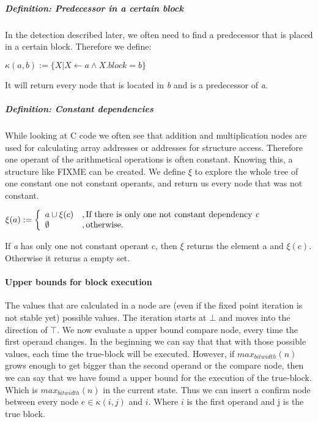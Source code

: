 \subparagraph{Definition: Predecessor in a certain block}
In the detection described later, we often need to find a predecessor that is placed in a certain block. Therefore we define:
\begin{center}
$\kappa(a, b) := \{X| X \leftarrow a \wedge X.block = b \}$ 
\end{center}

It will return every node that is located in \textit{b} and is a predecessor of \textit{a}.

\subparagraph{Definition: Constant dependencies}
While looking at C code we often see that addition and multiplication nodes are used for calculating array addresses or addresses for structure access. Therefore one operant of the arithmetical operations is often constant. Knowing this, a structure like FIXME %
can be created. We define $\xi$ to explore the whole tree of one constant one not constant operants, and return us every node that was not constant.
\begin{center}
$\xi(a) := 
\left\{
	\begin{array}{l}
		a \cup \xi(c)\\ 
		\emptyset
	\end{array}
	\begin{array}{l}
		, \text{If there is only one not constant dependency \textit{c}} \\ 
		, \text{otherwise}.
	\end{array}
\right.$
\end{center}

If \textit{a} has only one not constant operant c, then $\xi$ returns the element a and $\xi(c)$. Otherwise it returns a empty set.

\paragraph{Upper bounds for block execution}
The values that are calculated in a node are (even if the fixed point iteration is not stable yet) possible values. The iteration starts at $\bot$ and moves into the direction of $\top$. 
We now evaluate a upper bound compare node, every time the first operand changes. In the beginning we can say that that with those possible values, each time the true-block will be executed. However, if $max _{bitwidth}(n)$ grows enough to get bigger than the second operand or the compare node, then we can say that we have found a upper bound for the execution of the true-block. Which is $max _{bitwidth}(n)$ in the current state. Thus we can insert a confirm node between every node $e \in \kappa(i, j)$ and $i$. Where $i$ is the first operand and j is the true block.

